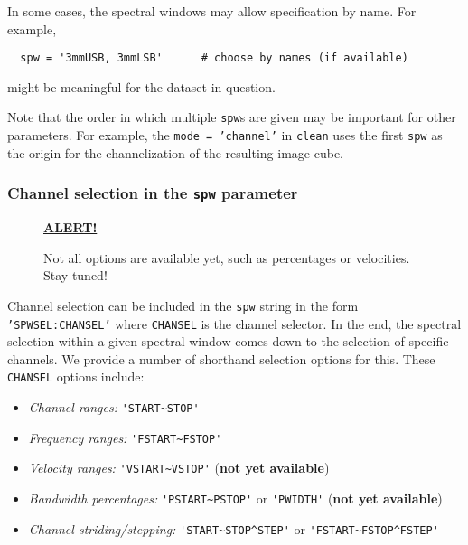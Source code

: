 In some cases, the spectral windows may allow specification by name.
For example,
\small
\begin{verbatim}
  spw = '3mmUSB, 3mmLSB'      # choose by names (if available)
\end{verbatim}
\normalsize
might be meaningful for the dataset in question.

Note that the order in which multiple {\tt spw}s are given may be
important for other parameters.
For example, the {\tt mode = 'channel'} in {\tt clean} uses the
first {\tt spw} as the origin for the channelization of the resulting
image cube.

\subsubsection{Channel selection in the {\tt spw} parameter}
\label{section:io.selection.spw.channel}

\begin{wrapfigure}{r}{2.5in}
  \begin{boxedminipage}{2.5in}
     \centerline{\underline{\bf ALERT!}}
     Not all options are available yet, such as
     percentages or velocities. Stay tuned!
  \end{boxedminipage}
\end{wrapfigure}
Channel selection can be included in the {\tt spw} string in the form
{\tt 'SPWSEL:CHANSEL'} where {\tt CHANSEL} is the channel selector.
In the end, the spectral selection within a given spectral window
comes down to the selection of specific channels.  We provide a number
of shorthand selection options for this.  These {\tt CHANSEL} 
options include:
\begin{itemize}
\item {\it Channel ranges:} {\verb!'START~STOP'!}
\item {\it Frequency ranges:} {\verb!'FSTART~FSTOP'!}
\item {\it Velocity ranges:} {\verb!'VSTART~VSTOP'!} ({\bf not yet available})
\item {\it Bandwidth percentages:} {\verb!'PSTART~PSTOP'!} or {\verb!'PWIDTH'!}
           ({\bf not yet available})
\item {\it Channel striding/stepping:} {\verb!'START~STOP^STEP'!} or 
           {\verb!'FSTART~FSTOP^FSTEP'!}
\end{itemize}

